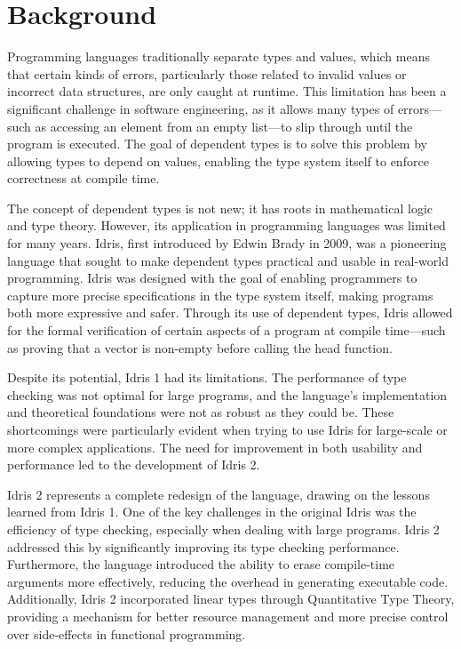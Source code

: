 \documentclass[]{rptuseminar}
\begin{document}
\section{Background}  
\label{sec:background}  
Programming languages traditionally separate types and values, which means that certain kinds of errors, particularly those related to invalid values or incorrect data structures, are only caught at runtime. This limitation has been a significant challenge in software engineering, as it allows many types of errors—such as accessing an element from an empty list—to slip through until the program is executed. The goal of dependent types is to solve this problem by allowing types to depend on values, enabling the type system itself to enforce correctness at compile time.

The concept of dependent types is not new; it has roots in mathematical logic and type theory. However, its application in programming languages was limited for many years. Idris, first introduced by Edwin Brady in 2009, was a pioneering language that sought to make dependent types practical and usable in real-world programming. Idris was designed with the goal of enabling programmers to capture more precise specifications in the type system itself, making programs both more expressive and safer. Through its use of dependent types, Idris allowed for the formal verification of certain aspects of a program at compile time—such as proving that a vector is non-empty before calling the head function.

Despite its potential, Idris 1 had its limitations. The performance of type checking was not optimal for large programs, and the language’s implementation and theoretical foundations were not as robust as they could be. These shortcomings were particularly evident when trying to use Idris for large-scale or more complex applications. The need for improvement in both usability and performance led to the development of Idris 2.

Idris 2 represents a complete redesign of the language, drawing on the lessons learned from Idris 1. One of the key challenges in the original Idris was the efficiency of type checking, especially when dealing with large programs. Idris 2 addressed this by significantly improving its type checking performance. Furthermore, the language introduced the ability to erase compile-time arguments more effectively, reducing the overhead in generating executable code. Additionally, Idris 2 incorporated linear types through Quantitative Type Theory, providing a mechanism for better resource management and more precise control over side-effects in functional programming.
\end{document}
